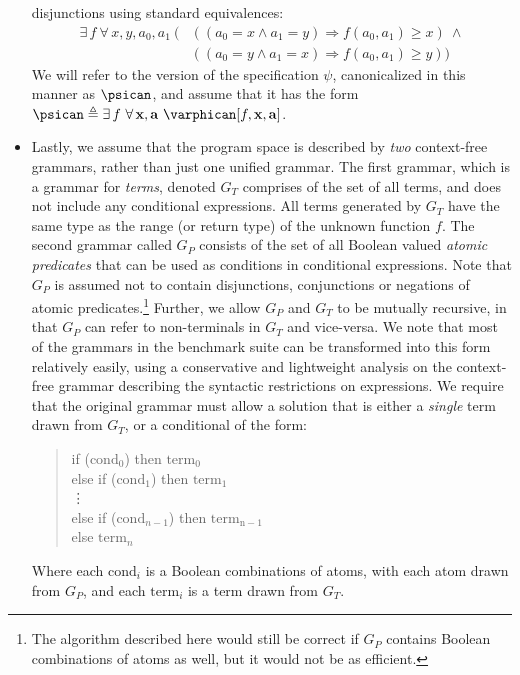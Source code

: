\begin{itemize}
disjunctions using standard equivalences:
\begin{align*}
\exists\,f\ \forall\, x, y, a_0, a_1\ (&((a_0 = x \wedge a_1 = y)
\Rightarrow f(a_0, a_1) \geq x)\ \wedge\\
& ((a_0 = y \wedge a_1 = x)
\Rightarrow f(a_0, a_1) \geq y))
\end{align*}
We will refer to the version of the specification $\psi$,
canonicalized in this manner as $\psican$, and assume that it has the
form $\psican \triangleq \exists\,f\ \forall\,\mathbf{x},\mathbf{a}\
\varphican[f, \mathbf{x}, \mathbf{a}]$.
\item
Lastly, we assume that the program space is described by \emph{two}
context-free grammars, rather than just one unified grammar. The first
grammar, which is a grammar for \emph{terms}, denoted $G_T$ comprises
of the set of all terms, and does not include any conditional
expressions. All terms generated by $G_T$ have the same type as the
range (or return type) of the unknown function $f$. The second grammar
called $G_P$ consists of the set of all Boolean valued \emph{atomic
predicates} that can be used as conditions in conditional
expressions. Note that $G_P$ is assumed not to contain disjunctions,
conjunctions or negations of atomic predicates.\footnote{The algorithm
described here would still be correct if $G_P$ contains Boolean
combinations of atoms as well, but it would not be as efficient.}
Further, we allow $G_P$ and $G_T$ to be mutually recursive, in that
$G_P$ can refer to non-terminals in $G_T$ and vice-versa. We note that
most of the grammars in the \sygusbody benchmark suite can be transformed
into this form relatively easily, using a conservative and lightweight
analysis on the context-free grammar describing the syntactic
restrictions on expressions. We require that the original grammar must allow a solution
that is either a \emph{single} term drawn from $G_T$, or a conditional
of the form:
\begin{quote}
\centering
\tabbedcode{\linewidth}{\small} {
if ($\mathrm{cond}_0$) then $\mathrm{term}_0$\\
else if ($\mathrm{cond}_1$) then $\mathrm{term}_1$\\
\vdots\\
else if ($\mathrm{cond}_{n-1}$) then $\mathrm{term_{n-1}}$\\
else $\mathrm{term}_{n}$
}
\end{quote}
Where each $\mathrm{cond}_{i}$ is a Boolean combinations of
atoms, with each atom drawn from $G_P$, and
each $\mathrm{term}_{i}$ is a term drawn from $G_T$.
\end{itemize}

